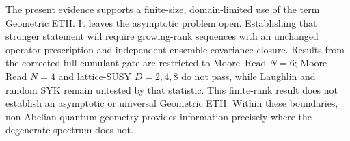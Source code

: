 The present evidence supports a finite-size, domain-limited use of the term Geometric ETH. It leaves the asymptotic problem open. Establishing that stronger statement will require growing-rank sequences with an unchanged operator prescription and independent-ensemble covariance closure. Results from the corrected full-cumulant gate are restricted to Moore--Read $N=6$; Moore--Read $N=4$ and lattice-SUSY $D=2,4,8$ do not pass, while Laughlin and random SYK remain untested by that statistic. This finite-rank result does not establish an asymptotic or universal Geometric ETH. Within these boundaries, non-Abelian quantum geometry provides information precisely where the degenerate spectrum does not.
